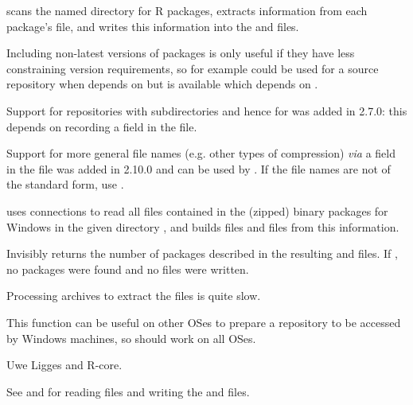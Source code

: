 \begin{Details}\relax
{} scans the named directory for R packages,
extracts information from each package's  file, and
writes this information into the  and
 files.

Including non-latest versions of packages is only useful if they have
less constraining version requirements, so for example
 could be used for a source repository when
 depends on  but  is
available which depends on .

Support for repositories with subdirectories and hence for
 was added in \R{} 2.7.0: this depends on
recording a  field in the  file.

Support for more general file names (e.g. other types of compression)
\emph{via} a  field in the  file was added
in \R{} 2.10.0 and can be used by .  If
the file names are not of the standard form, use
.

 uses  connections to read
all  files contained in the (zipped) binary packages
for Windows in the given directory , and builds files
 and  files from this information.
\end{Details}
%
\begin{Value}
Invisibly returns the number of packages described in the resulting
 and  files.  If , no
packages were found and no files were written.
\end{Value}
%
\begin{Note}\relax
Processing  archives to extract the 
files is quite slow.

This function can be useful on other OSes to prepare a repository to
be accessed by Windows machines, so  should
work on all OSes.
\end{Note}
%
\begin{Author}\relax
Uwe Ligges and R-core.
\end{Author}
%
\begin{SeeAlso}\relax
See  and  for reading
 files and writing the  and
 files.
\end{SeeAlso}

